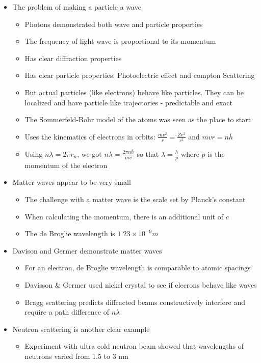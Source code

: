 \documentclass[12pt]{article}
\begin{document}
\begin{itemize}
    \item The problem of making a particle a wave \begin{itemize}
        \item Photons demonstrated both wave and particle properties
        \item The frequency of light wave is proportional to its momentum
        \item Has clear diffraction properties 
        \item Has clear particle properties: Photoelectric effect and compton Scattering
        \item But actual particles (like electrons) behave like particles. They can be localized and have particle like trajectories - predictable and exact
        \item The Sommerfeld-Bohr model of the atoms was seen as the place to start
        \item Uses the kinematics of electrons in orbits: $\frac{mv^2}{r} = \frac{Ze^2}{r^2}$ and $mvr = n \bar{h}$
        \item Using $n \lambda = 2 \pi r_n$, we got $n \lambda = \frac{2 \pi n \bar{h}}{mv}$ so that $\lambda = \frac{h}{p}$ where $p$ is the momentum of the electron
    \end{itemize}
    \item Matter waves appear to be very small \begin{itemize}
        \item The challenge with a matter wave is the scale set by Planck's constant
        \item When calculating the momentum, there is an additional unit of $c$
        \item The de Broglie wavelength is $1.23 \times 10^{-9} m$
    \end{itemize}
    \item Davison and Germer demonstrate matter waves \begin{itemize}
        \item For an electron, de Broglie wavelength is comparable to atomic spacings 
        \item Davisson \& Germer used nickel crystal to see if elecrons behave like waves 
        \item Bragg scattering predicts diffracted beams constructively interfere and require a path difference of $n \lambda$
    \end{itemize}
    \item Neutron scattering is another clear example \begin{itemize}
    \item Experiment with ultra cold neutron beam showed that wavelengths of neutrons varied from 1.5 to 3 nm
    \end{itemize}
\end{itemize}
\end{document}
